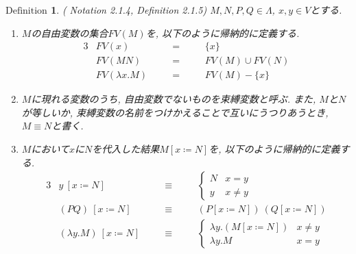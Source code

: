 \documentclass[11pt]{jsreport}
\theoremstyle{mystyle}
\newtheorem{df}{$\textrm{Definition}$}[subsection]
\newcommand{\0}{\textbf{0}}
\newcommand{\1}{\textbf{1}}
\newcommand{\2}{\textbf{2}}
\begin{document}
\begin{shadebox}
  \begin{df}{(\cite{Bar} Notation 2.1.4, Definition 2.1.5)}
    $M, N, P, Q \in \Lambda$, $x, y \in V$とする. 
    \begin{enumerate}
      \item $M$の自由変数の集合$FV(M)$を, 以下のように帰納的に定義する. 
        \begin{alignat*}{3}
          &FV(x)& \quad &=& \quad &\{ x \} \\
          &FV(MN)& &=& &FV(M) \cup FV(N) \\
          &FV(\lambda x. M)& &=& &FV(M) - \{ x \}
        \end{alignat*}
      \item $M$に現れる変数のうち, 自由変数でないものを束縛変数と呼ぶ. 
               また, $M$と$N$が等しいか, 束縛変数の名前をつけかえることで互いにうつりあうとき,
               $M \equiv N$と書く.
      \item $M$において$x$に$N$を代入した結果$M[x \coloneqq N]$を, 
               以下のように帰納的に定義する. 
        \begin{alignat*}{3}
        &y\ [x \coloneqq N]& \quad &\equiv& \quad &\begin{cases}
                                                                          N & x = y \\
                                                                          y & x \neq y
                                                                       \end{cases} \\
        &(PQ)\ [x \coloneqq N]& &\equiv& &(P [x \coloneqq N])\ (Q [x \coloneqq N]) \\
        &(\lambda y.M)\ [x \coloneqq N]& &\equiv& &\begin{cases}
                                                \lambda y .(M [x \coloneqq N]) & x \neq y \\
                                                \lambda y .M & x = y
                                                                       \end{cases}
        \end{alignat*}
    \end{enumerate}
  \end{df}
\end{shadebox}
\end{document}
